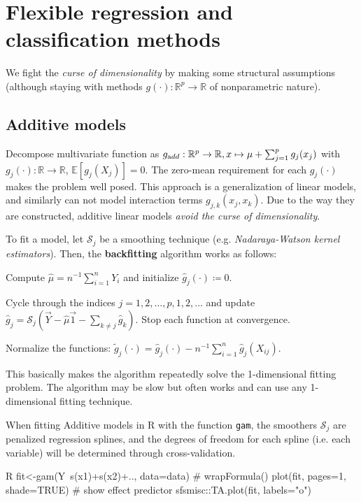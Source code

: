 \section{\Large Flexible regression and classification methods}\label{sec:flexible_regression_and_classification_methods}
We fight the \emph{curse of dimensionality} by making some structural assumptions (although staying with methods $g(\cdot): \mathbb{R}^p \to \mathbb{R}$ of nonparametric nature).
\subsection{Additive models}%
\label{sub:additive_models}
\begin{sectionbox}\nospacing{}
  Decompose multivariate function as $g_{\textrm add}: \mathbb{R}^p\to\mathbb{R}, x\mapsto \mu + \sum_{j=1}^pg_j(x_j)$ with $g_j(\cdot): \mathbb{R}\to\mathbb{R}$, $\mathbb{E}[g_j(X_j)]=0$.
  The zero-mean requirement for each $g_j(\cdot)$ makes the problem well posed.
  This approach is a generalization of linear models, and similarly can not model interaction terms $g_{j,k}(x_j, x_k)$.
  Due to the way they are constructed, additive linear models \emph{avoid the curse of dimensionality}.
\end{sectionbox}
\begin{sectionbox}\nospacing{}
  To fit a model, let $\mathcal{S}_j$ be a smoothing technique (e.g. \emph{Nadaraya-Watson kernel estimators}).
  Then, the \textbf{backfitting} algorithm works as follows:
  \begin{itemizenosep}
    \item Compute $\hat \mu = n^{-1}\sum_{i=1}^n Y_i$ and initialize $\hat g_j(\cdot) \coloneqq 0$.
    \item Cycle through the indices $j = 1,2,\dots,p,1,2,\dots$ and update
      $\hat g_j=\mathcal{S}_j(\vec{Y}-\hat \mu\vec{1}-\sum_{k\neq j}\hat g_k)$.
      Stop each function at convergence.
    \item Normalize the functions: $\tilde g_j(\cdot) = \hat g_j(\cdot) - n^{-1}\sum_{i=1}^n\hat g_j(X_{ij})$.
  \end{itemizenosep}
  This basically makes the algorithm repeatedly solve the 1-dimensional fitting problem.
  The algorithm may be slow but often works and can use any 1-dimensional fitting technique.
\end{sectionbox}
\begin{sectionbox}\nospacing{}
  When fitting Additive models in R with the function \verb!gam!, the smoothers $\mathcal{S}_j$ are penalized regression splines, and the degrees of freedom for each spline (i.e. each variable) will be determined through cross-validation.

  \begin{mintlinebox}{R}
    fit<-gam(Y~s(x1)+s(x2)+.., data=data) # wrapFormula()
    plot(fit, pages=1, shade=TRUE) # show effect predictor
    sfsmisc::TA.plot(fit, labels="o")
  \end{mintlinebox}
\end{sectionbox}

